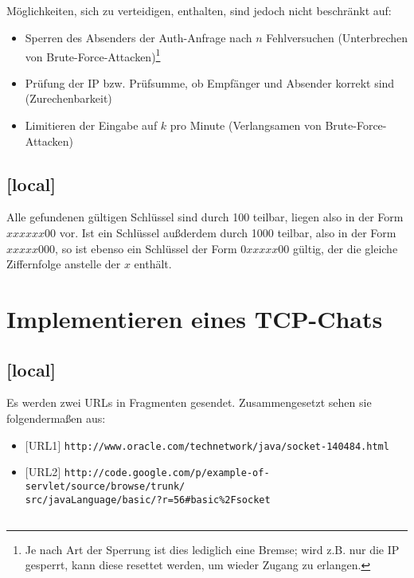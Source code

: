 \documentclass[twoside]{article}
\begin{document}
\subsection{}
Möglichkeiten, sich zu verteidigen, enthalten, sind jedoch nicht beschränkt auf:
\begin{itemize}
	\item Sperren des Absenders der Auth-Anfrage nach $n$ Fehlversuchen (Unterbrechen von Brute-Force-Attacken)\footnote{Je nach Art der Sperrung ist dies lediglich eine Bremse; wird z.B. nur die IP gesperrt, kann diese resettet werden, um wieder Zugang zu erlangen.}
	\item Prüfung der IP bzw. Prüfsumme, ob Empfänger und Absender korrekt sind (Zurechenbarkeit)
	\item Limitieren der Eingabe auf $k$ pro Minute (Verlangsamen von Brute-Force-Attacken)
\end{itemize}
\subsection{[local]}
Alle gefundenen gültigen Schlüssel sind durch 100 teilbar, liegen also in der Form $xxxxxx00$ vor.
Ist ein Schlüssel außderdem durch 1000 teilbar, also in der Form $xxxxx000$, so ist ebenso ein Schlüssel der Form $0xxxxx00$ gültig, der die gleiche Ziffernfolge anstelle der $x$ enthält.


\section{Implementieren eines TCP-Chats}
\subsection{[local]}
Es werden zwei URLs in Fragmenten gesendet.
Zusammengesetzt sehen sie folgendermaßen aus:
\begin{itemize}
	\item $[$URL1$]$ \texttt{http://www.oracle.com/technetwork/java/socket-140484.html}
	\item $[$URL2$]$ \texttt{http://code.google.com/p/example-of-servlet/source/browse/trunk/}\\\texttt{src/javaLanguage/basic/?r=56\#basic\%2Fsocket}
\end{itemize}
\subsection{}
\subsection{}
\end{document}
